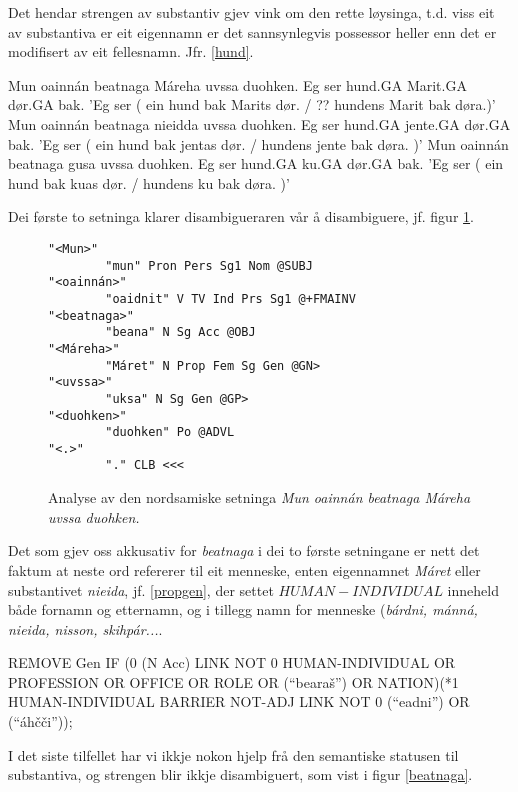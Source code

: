 \documentclass[a4paper,norsk]{article}
\begin{document}
Det hendar strengen av substantiv gjev vink om den rette løysinga, t.d. viss eit av substantiva er eit eigennamn er det sannsynlegvis possessor heller enn det er modifisert av eit fellesnamn. Jfr. \ref{hund}. %

\begin{example}\label{hund}
\gll Mun oainnán beatnaga Máreha uvssa duohken.
 Eg ser hund.GA Marit.GA dør.GA bak.
\glt 'Eg ser ( ein hund bak Marits dør. / ?? hundens Marit bak døra.)'
\glend
\gll Mun oainnán beatnaga nieidda uvssa duohken.
  Eg ser hund.GA jente.GA dør.GA bak.
\glt 'Eg ser ( ein hund bak jentas dør. / hundens jente bak døra. )'
\glend
\gll Mun oainnán beatnaga gusa uvssa duohken.
  Eg ser hund.GA ku.GA dør.GA bak.
\glt 'Eg ser ( ein hund bak kuas dør. / hundens ku bak døra. )'
\glend
\end{example}

Dei første to setninga klarer disambigueraren vår å disambiguere, jf. figur \ref{Mareha}. %

\begin{figure}[htbp]
\begin{center}
\begin{verbatim}
"<Mun>" 
        "mun" Pron Pers Sg1 Nom @SUBJ
"<oainnán>"
        "oaidnit" V TV Ind Prs Sg1 @+FMAINV
"<beatnaga>" 
        "beana" N Sg Acc @OBJ
"<Máreha>" 
        "Máret" N Prop Fem Sg Gen @GN>
"<uvssa>" 
        "uksa" N Sg Gen @GP>
"<duohken>"
        "duohken" Po @ADVL
"<.>"
        "." CLB <<<
\end{verbatim}
\caption{Analyse av den nordsamiske setninga \textit{Mun oainnán beatnaga Máreha uvssa duohken.}}
\label{Mareha}
\end{center}
\end{figure}


Det som gjev oss akkusativ for \textit{beatnaga} i dei to første setningane er nett det faktum at neste ord refererer til eit menneske, enten eigennamnet \textit{Máret} eller substantivet \textit{nieida}, jf. \ref{propgen}, der settet $HUMAN-INDIVIDUAL$ inneheld både fornamn og etternamn, og i tillegg namn for menneske (\textit{bárdni, mánná, nieida, nisson, skihpár...}.   %

\begin{example}\label{propgen}
REMOVE Gen IF (0 (N Acc) LINK NOT 0 HUMAN-INDIVIDUAL OR PROFESSION OR OFFICE OR ROLE OR (``bearaš'') OR NATION)(*1 HUMAN-INDIVIDUAL BARRIER NOT-ADJ LINK NOT 0 (``eadni'') OR (``áhčči''));
\end{example}

I det siste tilfellet har vi ikkje nokon hjelp frå den semantiske statusen til substantiva, og strengen blir ikkje disambiguert, som vist i figur \ref{beatnaga}. %
\end{document}
